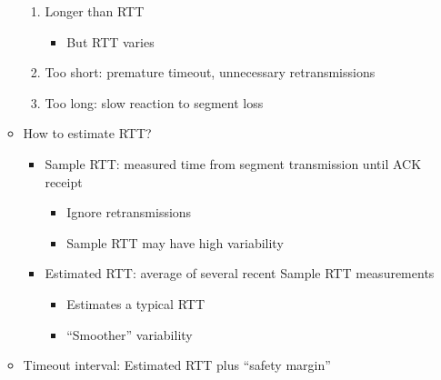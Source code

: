 \begin{itemize}
\begin{itemize}
        \begin{enumerate}

          \item Longer than RTT

            \begin{itemize}

              \item But RTT varies

            \end{itemize}

          \item Too short: premature timeout, unnecessary retransmissions

          \item Too long: slow reaction to segment loss

        \end{enumerate}

      \item How to estimate RTT?

        \begin{itemize}

          \item Sample RTT: measured time from segment transmission until ACK receipt

            \begin{itemize}

              \item Ignore retransmissions

              \item Sample RTT may have high variability

            \end{itemize}

          \item Estimated RTT: average of several recent Sample RTT measurements

            \begin{itemize}

              \item Estimates a typical RTT

              \item ``Smoother'' variability

            \end{itemize}

        \end{itemize}

      \item Timeout interval: Estimated RTT plus ``safety margin''


\end{itemize}
\end{itemize}
